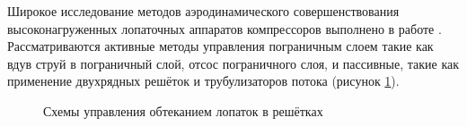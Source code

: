 Широкое исследование методов аэродинамического совершенствования высоконагруженных лопаточных аппаратов компрессоров выполнено в работе \cite{Tereschenko1988}. Рассматриваются активные методы управления пограничным слоем такие как вдув струй в пограничный слой, отсос пограничного слоя, и пассивные, такие как применение двухрядных решёток и трубулизаторов  потока (рисунок \ref{fig:Tereshenko1988}).

\begin{figure} [ht]
\caption{Схемы управления обтеканием лопаток в решётках \cite{Tereschenko1988}}
\label{fig:Tereshenko1988}
\end{figure}

